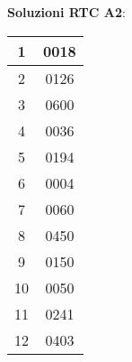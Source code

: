 \documentclass{article}
\begin{document}
\pagestyle{empty}

\textbf{Soluzioni RTC A2}:

\vspace{0.35cm}
\begin{tabular}{ | c | c | }
	
	\hline
	1 & 0018 \\

	\hline
	2 & 0126 \\

	\hline
	3 & 0600 \\

	\hline
	4 & 0036 \\

	\hline
	5 & 0194 \\

	\hline
	6 & 0004 \\

	\hline
	7 & 0060 \\

	\hline
	8 & 0450 \\

	\hline
	9 & 0150 \\

	\hline
	10 & 0050 \\

	\hline
	11 & 0241 \\
	
	\hline
	12 & 0403 \\

	\hline

\end{tabular}
\end{document}
